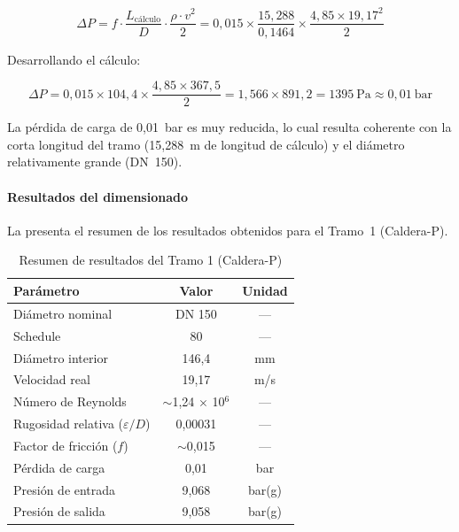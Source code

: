 \documentclass[12pt]{article}
\begin{document}
\begin{equation}
	\Delta P = f \cdot \frac{L_{\text{cálculo}}}{D} \cdot \frac{\rho \cdot v^2}{2} = 0{,}015 \times \frac{15{,}288}{0{,}1464} \times \frac{4{,}85 \times 19{,}17^2}{2}
	\label{eq:darcy-tramo1}
\end{equation}

Desarrollando el cálculo:

\begin{equation}
	\Delta P = 0{,}015 \times 104{,}4 \times \frac{4{,}85 \times 367{,}5}{2} = 1{,}566 \times 891{,}2 = 1395 \ \text{Pa} \approx 0{,}01 \ \text{bar}
	\label{eq:perdida-carga-tramo1}
\end{equation}

La pérdida de carga de 0,01~bar es muy reducida, lo cual resulta coherente con la corta longitud del tramo (15,288~m de longitud de cálculo) y el diámetro relativamente grande (DN~150).

\paragraph{Resultados del dimensionado}

La  presenta el resumen de los resultados obtenidos para el Tramo~1 (Caldera-P).

\begin{table}[H]
	\centering
	\caption{Resumen de resultados del Tramo 1 (Caldera-P)}
	\label{tab:resultados-tramo1}
	\begin{tabular}{lcc}
		\toprule
		\textbf{Parámetro}                   & \textbf{Valor}             & \textbf{Unidad} \\
		\midrule
		Diámetro nominal                     & DN 150                     & ---             \\
		Schedule                             & 80                         & ---             \\
		Diámetro interior                    & 146,4                      & mm              \\
		Velocidad real                       & 19,17                      & m/s             \\
		Número de Reynolds                   & $\sim$1,24 $\times$ 10$^6$ & ---             \\
		Rugosidad relativa ($\varepsilon/D$) & 0,00031                    & ---             \\
		Factor de fricción ($f$)             & $\sim$0,015                & ---             \\
		Pérdida de carga                     & 0,01                       & bar             \\
		Presión de entrada                   & 9,068                      & bar(g)          \\
		Presión de salida                    & 9,058                      & bar(g)          \\
		\bottomrule
	\end{tabular}
\end{table}
\end{document}
